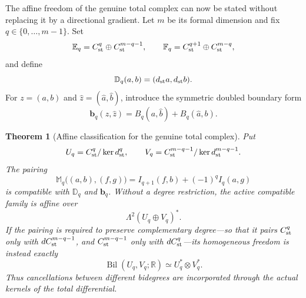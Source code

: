 \documentclass[11pt,a4paper]{article}
\newtheorem{theorem}{Theorem}[section]
\begin{document}
The affine freedom of the genuine total complex can now be stated without
replacing it by a directional gradient.  Let \(m\) be its formal dimension
and fix \(q\in\{0,\ldots,m-1\}\).  Set
\begin{equation}\label{eq:graded-double-spaces}
 \mathbb E_q=C_{\rm st}^q\oplus C_{\rm st}^{m-q-1},\qquad
 \mathbb F_q=C_{\rm st}^{q+1}\oplus C_{\rm st}^{m-q},
\end{equation}
and define
\begin{equation}\label{eq:graded-double-differential}
 \mathbb D_q(a,b)=(d_{\rm st}a,d_{\rm st}b).
\end{equation}
For \(z=(a,b)\) and \(\widehat z=(\widehat a,\widehat b)\), introduce the
symmetric doubled boundary form
\begin{equation}\label{eq:graded-double-boundary}
 \mathbf b_q(z,\widehat z)
 =B_q(a,\widehat b)+B_q(\widehat a,b).
\end{equation}

\begin{theorem}[Affine classification for the genuine total complex]
\label{thm:graded-affine}
Put
\[
 U_q=C_{\rm st}^q/\ker d_{\rm st}^q,
 \qquad
 V_q=C_{\rm st}^{m-q-1}/\ker d_{\rm st}^{m-q-1}.
\]
The pairing
\begin{equation}\label{eq:graded-double-pairing}
 \mathbb M_q\bigl((a,b),(f,g)\bigr)
 =I_{q+1}(f,b)+(-1)^qI_q(a,g)
\end{equation}
is compatible with \(\mathbb D_q\) and \(\mathbf b_q\).  Without a degree
restriction, the active compatible family is affine over
\begin{equation}\label{eq:graded-unrestricted-gauge}
 \Lambda^2(U_q\oplus V_q)^*.
\end{equation}
If the pairing is required to preserve complementary degree---so that it
pairs \(C_{\rm st}^q\) only with \(dC_{\rm st}^{m-q-1}\), and
\(C_{\rm st}^{m-q-1}\) only with \(dC_{\rm st}^{q}\)---its homogeneous
freedom is instead exactly
\begin{equation}\label{eq:graded-active-gauge}
 \boxed{\quad \operatorname{Bil}(U_q,V_q;\mathbb R)
       \simeq U_q^*\otimes V_q^*.\quad}
\end{equation}
Thus cancellations between different bidegrees are incorporated through
the actual kernels of the total differential.
\end{theorem}
\end{document}
